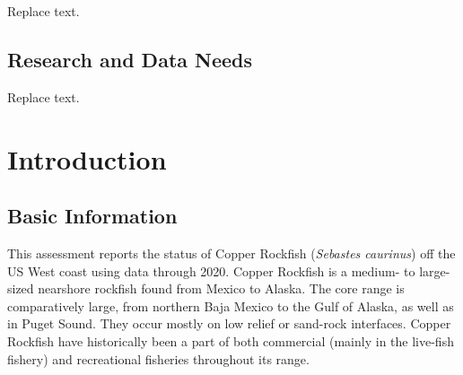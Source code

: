 \documentclass[11pt,
  english,
  a4paper,
]{article}
\begin{document}

Replace text.

\leavevmode\tagmcend\tagstructend\par


\hypertarget{research-and-data-needs}{%
\subsection*{Research and Data Needs}\label{research-and-data-needs}}

\leavevmode\tagmcend\tagstructend


Replace text.

\leavevmode\tagmcend\tagstructend\par

\pagebreak
\setlength{\parskip}{5mm plus1mm minus1mm}
\setcounter{page}{1}
\renewcommand{\thefigure}{\arabic{figure}}
\renewcommand{\thetable}{\arabic{table}}


\hypertarget{introduction}{%
\section{Introduction}\label{introduction}}

\leavevmode\tagmcend\tagstructend


\hypertarget{basic-information}{%
\subsection{Basic Information}\label{basic-information}}

\leavevmode\tagmcend\tagstructend


This assessment reports the status of Copper Rockfish (\emph{Sebastes caurinus}) off the US West coast using data through 2020. Copper Rockfish is a medium- to large-sized nearshore rockfish found from Mexico to Alaska. The core range is comparatively large, from northern Baja Mexico to the Gulf of Alaska, as well as in Puget Sound. They occur mostly on low relief or sand-rock interfaces. Copper Rockfish have historically been a part of both commercial (mainly in the live-fish fishery) and recreational fisheries throughout its range.
\end{document}
